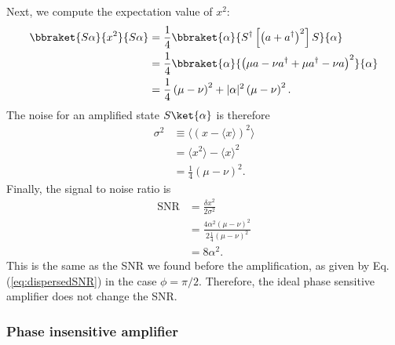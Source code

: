 Next, we compute the expectation value of $x^2$:
\begin{align}
\bbraket{S\alpha}{x^2}{S\alpha} &= \frac{1}{4}\bbraket{\alpha}{S^{\dagger}\left[ \left( a+a^{\dagger} \right)^2 \right] S}{\alpha} \\
&= \frac{1}{4} \bbraket{\alpha}{\left( \mu a-\nu a^{\dagger} + \mu a^{\dagger} - \nu a \right)^2}{\alpha} \\
&= \frac{1}{4} \left( \mu - \nu \right)^2 + |\alpha|^2 \left(\mu - \nu \right)^2 . \end{align}
The noise for an amplified state $S\ket{\alpha}$ is therefore \begin{align}
\sigma^2 &\equiv \langle(x - \langle x \rangle)^2 \rangle \\
&= \langle x^2 \rangle - \langle x \rangle^2 \\
&= \frac{1}{4}(\mu - \nu)^2 . \end{align}
Finally, the signal to noise ratio is \begin{align}
\text{SNR} &= \frac{\delta x^2}{2 \sigma^2} \\
&= \frac{4 \alpha^2 (\mu - \nu)^2}{2 \frac{1}{4} (\mu - \nu)^2} \\
&= 8 \alpha^2 . \end{align}
This is the same as the SNR we found before the amplification, as given by Eq.\,(\ref{eq:dispersedSNR}) in the case $\phi = \pi/2$.
Therefore, the ideal phase sensitive amplifier does not change the SNR.


\subsubsection{Phase insensitive amplifier}

